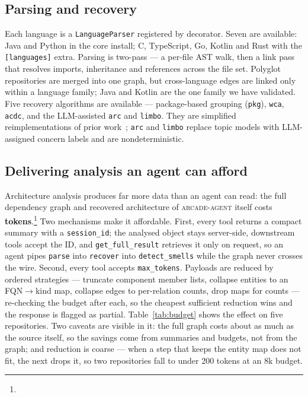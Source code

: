 \documentclass[10pt,conference]{IEEEtran}
\newcommand{\tool}[1]{\texttt{#1}}
\newcommand{\arcade}{\textsc{arcade-agent}}
\begin{document}
\subsection{Parsing and recovery}
Each language is a \tool{LanguageParser} registered by decorator. Seven are
available: Java and Python in the core install; C, TypeScript, Go, Kotlin and
Rust with the \tool{[languages]} extra. Parsing is two-pass --- a per-file AST
walk, then a link pass that resolves imports, inheritance and references across
the file set. Polyglot repositories are merged into one graph, but cross-language
edges are linked only within a language family; Java and Kotlin are the one
family we have validated. Five recovery algorithms are available ---
package-based grouping (\tool{pkg}), \tool{wca}, \tool{acdc}, and the
LLM-assisted \tool{arc} and \tool{limbo}. They are simplified reimplementations
of prior
work~\cite{tzerpos2000acdc,garcia2011arc,andritsos2004limbo,maqbool2004wca};
\tool{arc} and \tool{limbo} replace topic models with LLM-assigned concern
labels and are nondeterministic.

\subsection{Delivering analysis an agent can afford}
Architecture analysis produces far more data than an agent can read: the full
dependency graph and recovered architecture of \arcade{} itself costs
\textbf{\SelfFullTok{} tokens}.\footnote{\TokenFootnote} Two mechanisms make it
affordable. First, every tool returns a compact summary with a
\tool{session\_id}; the analysed object stays server-side, downstream tools
accept the ID, and \tool{get\_full\_result} retrieves it only on request, so an
agent pipes \tool{parse} into \tool{recover} into \tool{detect\_smells} while
the graph never crosses the wire. Second, every tool accepts \tool{max\_tokens}.
Payloads are reduced by ordered strategies --- truncate component member lists,
collapse entities to an FQN$\rightarrow$kind map, collapse edges to per-relation
counts, drop maps for counts --- re-checking the budget after each, so the
cheapest sufficient reduction wins and the response is flagged as partial.
Table~\ref{tab:budget} shows the effect on five repositories. Two caveats are
visible in it: the full graph costs about as much as the source itself, so the
savings come from summaries and budgets, not from the graph; and reduction is
coarse --- when a step that keeps the entity map does not fit, the next drops
it, so two repositories fall to under 200 tokens at an 8k budget.
\end{document}
